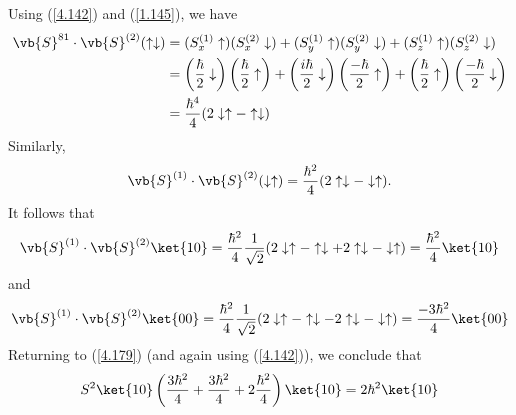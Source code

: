 Using (\ref{4.142}) and (\ref{1.145}), we have
\begin{align}
	\vb{S}^{81}\cdot\vb{S}^{(2)}(\uparrow\downarrow)&=(S_x^{(1)}\uparrow)(S_x^{(2)}\downarrow)+(S_y^{(1)}\uparrow)(S_y^{(2)}\downarrow)+(S_z^{(1)}\uparrow)(S_z^{(2)}\downarrow)\\
																									&=\left(\frac{\hbar}{2}\downarrow\right)\left(\frac{\hbar}{2}\uparrow\right)	+\left(\frac{i\hbar}{2}\downarrow\right)\left(\frac{-\hbar}{2}\uparrow\right)+\left(\frac{\hbar}{2}\uparrow\right)\left(\frac{-\hbar}{2}\downarrow\right)\\
																									&=\frac{\hbar^4}{4}(2\downarrow\uparrow-\uparrow\downarrow)
\end{align}
Similarly, $$\vb{S}^{(1)}\cdot\vb{S}^{(2)}(\downarrow\uparrow)=\frac{\hbar^2}{4}(2\uparrow\downarrow-\downarrow\uparrow).$$ It follows that
\begin{equation}\label{4.180}
	\vb{S}^{(1)}\cdot\vb{S}^{(2)}\ket{10}=\frac{\hbar^2}{4}\frac{1}{\sqrt{2}}(2\downarrow\uparrow-\uparrow\downarrow +2\uparrow\downarrow-\downarrow\uparrow)=\frac{\hbar^2}{4}\ket{10}
\end{equation}
and
\begin{equation}\label{4.181}
	\vb{S}^{(1)}\cdot\vb{S}^{(2)}\ket{00}=\frac{\hbar^2}{4}\frac{1}{\sqrt{2}}(2\downarrow\uparrow-\uparrow\downarrow -2\uparrow\downarrow-\downarrow\uparrow)=\frac{-3\hbar^2}{4}\ket{00}
\end{equation}
Returning to (\ref{4.179}) (and again using (\ref{4.142})), we conclude that
\begin{equation}\label{4.182}
	S^2\ket{10}\left(\frac{3\hbar^2}{4}+\frac{3\hbar^2}{4}+2\frac{\hbar^2}{4}\right)\ket{10}=2\hbar^2\ket{10}
\end{equation}


































